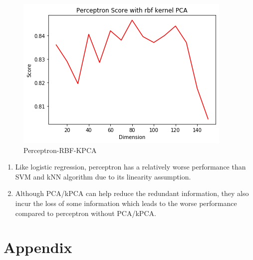 \documentclass[12pt]{article}
\begin{document}
\begin{figure}[htb]
\begin{minipage}{0.3\textwidth}
		\includegraphics[width=\linewidth]{./exp-figs/P-RBF-KPCA.png}
		\caption{Perceptron-RBF-KPCA}
		\label{fig:P-RBF-KPCA}
	\end{minipage}
\end{figure}

\begin{enumerate}[label=(\roman*)]
	\item Like logistic regression, perceptron has a relatively worse performance than SVM and kNN algorithm due to its linearity assumption.
	\item Although PCA/kPCA can help reduce the redundant information, they also incur the loss of some information which leads to the worse performance compared to perceptron without PCA/kPCA. 
\end{enumerate}

\section{\fontsize{12}{12}\selectfont Appendix}

\begin{table}[htpb]
	\centering
	\caption*{\small{Summary of Used Algorithms}}
\end{table}

%
\end{document}
